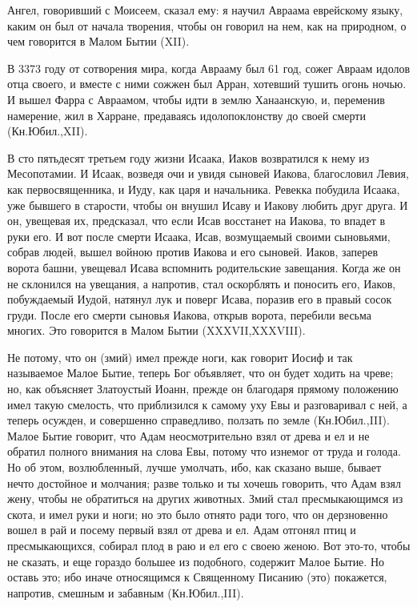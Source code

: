 Ангел, говоривший с Моисеем, сказал ему: я
научил Авраама еврейскому языку, каким он был от
начала творения, чтобы он говорил на нем, как на
природном, о чем говорится в Малом Бытии (XII).

В 3373 году от сотворения мира, когда Аврааму был
61 год, сожег Авраам идолов отца своего, и вместе с
ними сожжен был Арран, хотевший тушить огонь
ночью. И вышел Фарра с Авраамом, чтобы идти в
землю Ханаанскую, и, переменив намерение, жил в
Харране, предаваясь идолопоклонству до своей
смерти (Кн.Юбил.,XII).

В сто пятьдесят третьем году жизни Исаака,
Иаков возвратился к нему из Месопотамии. И Исаак,
возведя очи и увидя сыновей Иакова, благословил
Левия, как первосвященника, и Иуду, как царя и
начальника. Ревекка побудила Исаака, уже бывшего
в старости, чтобы он внушил Исаву и Иакову любить
друг друга. И он, увещевая их, предсказал, что если
Исав восстанет на Иакова, то впадет в руки его. И
вот после смерти Исаака, Исав, возмущаемый своими
сыновьями, собрав людей, вышел войною против
Иакова и его сыновей. Иаков, заперев ворота башни,
увещевал Исава вспомнить родительские
завещания. Когда же он не склонился на увещания, а
напротив, стал оскорблять и поносить его, Иаков,
побуждаемый Иудой, натянул лук и поверг Исава,
поразив его в правый сосок груди. После его
смерти сыновья Иакова, открыв ворота, перебили
весьма многих. Это говорится в Малом Бытии
(XXXVII,XXXVIII).

Не потому, что он (змий) имел прежде ноги, как
говорит Иосиф и так называемое Малое Бытие,
теперь Бог объявляет, что он будет ходить на
чреве; но, как объясняет Златоустый Иоанн, прежде
он благодаря прямому положению имел такую
смелость, что приблизился к самому уху Евы и
разговаривал с ней, а теперь осужден, и
совершенно справедливо, ползать по земле
(Кн.Юбил.,III).
Малое Бытие говорит, что Адам неосмотрительно
взял от древа и ел и не обратил полного внимания
на слова Евы, потому что изнемог от труда и
голода. Но об этом, возлюбленный, лучше умолчать,
ибо, как сказано выше, бывает нечто достойное и
молчания; разве только и ты хочешь говорить, что
Адам взял жену, чтобы не обратиться на других
животных. Змий стал пресмыкающимся из скота, и
имел руки и ноги; но это было отнято ради того, что
он дерзновенно вошел в рай и посему первый взял
от древа и ел. Адам отгонял птиц и пресмыкающихся,
собирал плод в раю и ел его с своею женою. Вот
это-то, чтобы не сказать, и еще гораздо большее из
подобного, содержит Малое Бытие. Но оставь это;
ибо иначе относящимся к Священному Писанию (это)
покажется, напротив, смешным и забавным (Кн.Юбил.,III).

